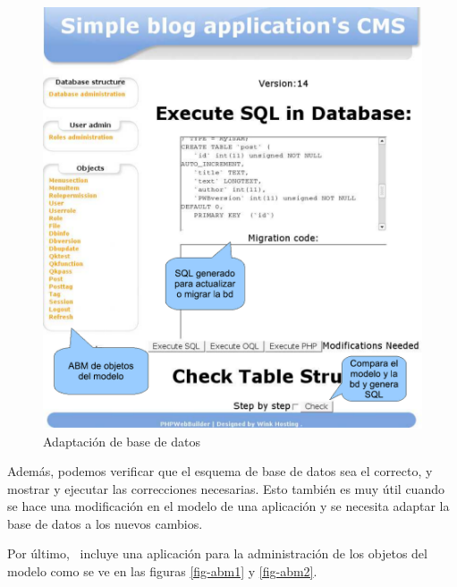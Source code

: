 \begin{figure}[h]
	\centering
	\includegraphics[scale=0.5]{images/admin2.pdf}
 	\caption{Adaptación de base de datos}
 	\label{fig-admin1}
\end{figure}

Además, podemos verificar que el esquema de base de datos sea el correcto, y mostrar y ejecutar las correcciones necesarias. Esto también es muy útil cuando se hace una modificación en el modelo de una aplicación y se necesita adaptar la base de datos a los nuevos cambios.

Por último, \PWB \ incluye una aplicación para la administración de los objetos del modelo como se ve en las figuras \ref{fig-abm1} y \ref{fig-abm2}.

